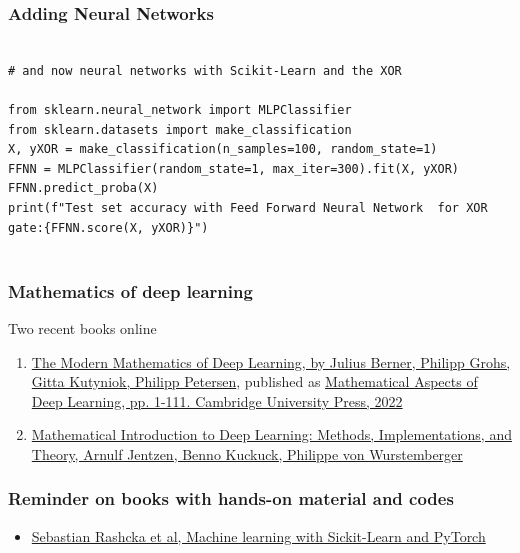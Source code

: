 \documentclass{beamer}
\begin{document}
\begin{frame}
\frametitle{Adding Neural Networks}

\begin{verbatim}

# and now neural networks with Scikit-Learn and the XOR

from sklearn.neural_network import MLPClassifier
from sklearn.datasets import make_classification
X, yXOR = make_classification(n_samples=100, random_state=1)
FFNN = MLPClassifier(random_state=1, max_iter=300).fit(X, yXOR)
FFNN.predict_proba(X)
print(f"Test set accuracy with Feed Forward Neural Network  for XOR gate:{FFNN.score(X, yXOR)}")


\end{verbatim}
\end{frame}

\begin{frame}
\frametitle{Mathematics of deep learning}

\begin{block}{Two recent books online }
\begin{enumerate}
\item \href{{https://arxiv.org/abs/2105.04026}}{The Modern Mathematics of Deep Learning, by Julius Berner, Philipp Grohs, Gitta Kutyniok, Philipp Petersen}, published as \href{{https://doi.org/10.1017/9781009025096.002}}{Mathematical Aspects of Deep Learning, pp. 1-111. Cambridge University Press, 2022}

\item \href{{https://doi.org/10.48550/arXiv.2310.20360}}{Mathematical Introduction to Deep Learning: Methods, Implementations, and Theory, Arnulf Jentzen, Benno Kuckuck, Philippe von Wurstemberger}
\end{enumerate}

\noindent
\end{block}
\end{frame}

\begin{frame}
\frametitle{Reminder on books with hands-on material and codes}

\begin{block}{}
\begin{itemize}
\item \href{{https://sebastianraschka.com/blog/2022/ml-pytorch-book.html}}{Sebastian Rashcka et al, Machine learning with Sickit-Learn and PyTorch}
\end{itemize}

\noindent
\end{block}
\end{frame}
\end{document}
